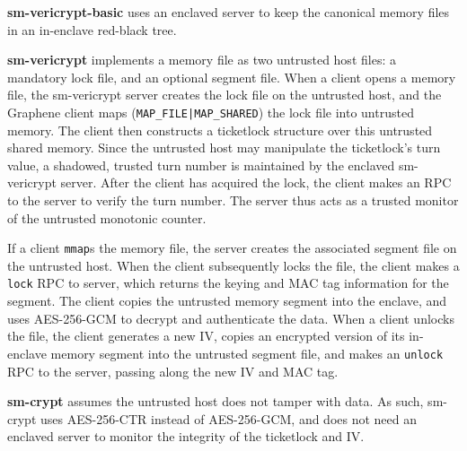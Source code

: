 \vspace*{-0.5\baselineskip}
\begin{widelist}

\item 
%
\textbf{sm-vericrypt-basic} uses an enclaved server to keep the canonical
memory files in an in-enclave red-black tree.

\item 
% 
\textbf{sm-vericrypt} implements a memory file as two untrusted host files: a
mandatory lock file, and an optional segment file.
%
When a client opens a memory file, the sm-vericrypt server creates the lock file on the
untrusted host, and the Graphene client maps (\texttt{MAP\_FILE|MAP\_SHARED})
the lock file into untrusted memory.
%
The client then constructs a ticketlock structure over this untrusted shared
memory.
%
Since the untrusted host may manipulate the ticketlock's turn value, a
shadowed, trusted turn number is maintained by the enclaved sm-vericrypt
server.
%
After the client has acquired the lock, the client makes an RPC to the
server to verify the turn number.
%
The server thus acts as a trusted monitor of the untrusted monotonic
	counter.


If a client \texttt{mmap}s the memory file, the server creates the
associated segment file on the untrusted host.
%
When the client subsequently locks the file, the client makes a \texttt{lock}
RPC to server, which returns the keying and MAC tag information for
the segment.
%
The client copies the untrusted memory segment into the enclave, and uses
AES-256-GCM to decrypt and authenticate the data.
% 
When a client unlocks the file, the client generates a new IV, copies an
encrypted version of its in-enclave memory segment into the untrusted
segment file, and makes an \texttt{unlock} RPC to the server, passing along
the new IV and MAC tag.


\item 
%    
\textbf{sm-crypt} 
	assumes the untrusted host does not
tamper with data.  As such, sm-crypt uses AES-256-CTR instead of AES-256-GCM,
and does not need an enclaved server to monitor the integrity of the ticketlock
and IV.

\end{widelist}




